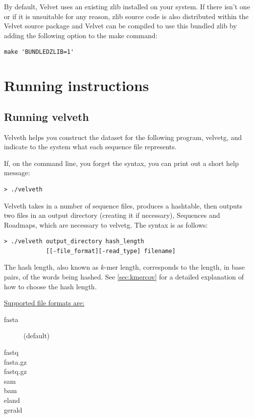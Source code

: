 \documentclass{article}
\begin{document}
By default, Velvet uses an existing zlib installed on your system. If there isn't one or if it is unsuitable for any reason, zlib source code is also distributed within the Velvet source package and Velvet can be compiled to use this bundled zlib by adding the following option to the make command:

\begin{verbatim}
make 'BUNDLEDZLIB=1'
\end{verbatim}

\section{Running instructions}

\subsection{Running velveth}

Velveth helps you construct the dataset for the following program, velvetg, and indicate to the system what  each sequence file represents.

If, on the command line, you forget the syntax, you can print out a short help message:
\begin{verbatim}
> ./velveth
\end{verbatim}

\label{sec:hashing}

Velveth takes in a number of sequence files, produces a hashtable, then outputs two files in an output directory (creating it if necessary), Sequences and Roadmaps, which are necessary to velvetg. The syntax is as follows:

\begin{verbatim}
> ./velveth output_directory hash_length 
            [[-file_format][-read_type] filename]
\end{verbatim}

The hash length, also known as $k$-mer length, corresponds to the length, in base pairs, of the words being hashed. See \ref{sec:kmercov} for a detailed explanation of how to choose the hash length.

\underline{Supported file formats are:}
\begin{description}
\item[fasta] (default) 
\item[fastq]
\item[fasta.gz]
\item[fastq.gz]
\item[sam]
\item[bam]
\item[eland]
\item[gerald]
\end{description}
\end{document}
